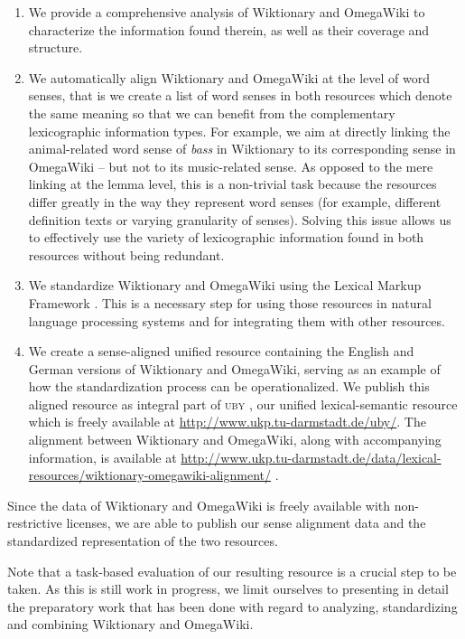 \documentclass[output=paper]{LSP/langsci}
\begin{document}
\begin{enumerate}
  \item We provide a comprehensive analysis of Wiktionary and OmegaWiki to characterize the information found therein, as well as their coverage and structure. 
  \item We automatically align Wiktionary and OmegaWiki at the level of word senses, that is we create a list of word senses in both resources which denote the same meaning so that we can benefit from the complementary lexicographic information types. For example, we aim at directly linking the animal-related word sense of \textit{bass} in Wiktionary to its corresponding sense in OmegaWiki -- but not to its music-related sense. As opposed to the mere linking at the lemma level, this is a non-trivial task because the resources differ greatly in the way they represent word senses (for example, different definition texts or varying granularity of senses).  Solving this issue allows us to effectively use the variety of lexicographic information found in both resources without being redundant.
  \item We standardize Wiktionary and OmegaWiki using the Lexical Markup Framework \citep{Francopoulo2009}. This is a necessary step for using those resources in natural language processing systems and for integrating them with other resources. 
  \item We create a sense-aligned unified resource containing the English and German versions of Wiktionary and OmegaWiki, serving as an example of how the standardization process can be operationalized. We publish this aligned resource as integral part of \textsc{uby} \citep{Gurevych12}, our unified lexical-semantic resource which is freely available at \url{http://www.ukp.tu-darmstadt.de/uby/}. The alignment between Wiktionary and OmegaWiki, along with accompanying information, is available at \url{http://www.ukp.tu-darmstadt.de/data/lexical-resources/wiktionary-omegawiki-alignment/} .
\end{enumerate}

\noindent
Since the data of Wiktionary and OmegaWiki is freely available with non-restric\-tive licenses, we are able to publish our sense alignment data and the standardized representation of the two resources. %

Note that a task-based evaluation of our resulting resource is a crucial step to be taken. As this is still work in progress, we limit ourselves to presenting in detail the preparatory work that has been done with regard to analyzing, standardizing and combining Wiktionary and OmegaWiki. 
\end{document}
